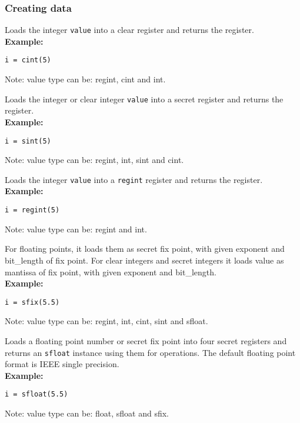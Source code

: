 \newpage

\subsubsection{Creating data}

Loads the integer \verb|value| into a clear register and returns the register.\\
\textbf{Example:}
\begin{lstlisting}
i = cint(5)
\end{lstlisting}
\begin{footnotesize}
Note: value type can be: regint, cint and int.
\end{footnotesize}

Loads the integer or clear integer \verb|value| into a secret register and returns the register.\\
\textbf{Example:}
\begin{lstlisting}
i = sint(5)
\end{lstlisting}
\begin{footnotesize}
Note: value type can be: regint, int, sint and cint.
\end{footnotesize}

Loads the integer \verb|value| into a \verb|regint| register and returns 
the register.\\
\textbf{Example:}
\begin{lstlisting}
i = regint(5)
\end{lstlisting}
\begin{footnotesize}
Note: value type can be: regint and int.
\end{footnotesize}

For floating points, it loads them as secret fix point, with given exponent and bit_length of fix point.
For clear integers and secret integers it loads value as mantissa of fix point, with given exponent and bit_length.\\
\textbf{Example:}
\begin{lstlisting}
i = sfix(5.5)
\end{lstlisting}
\begin{footnotesize}
Note: value type can be: regint, int, cint, sint and sfloat.
\end{footnotesize}

Loads a floating point number or secret fix point into four secret registers and returns an \verb|sfloat| instance using them for operations.
The default floating point format is IEEE single precision.\\
\textbf{Example:}
\begin{lstlisting}
i = sfloat(5.5)
\end{lstlisting}
\begin{footnotesize}
Note: value type can be: float, sfloat and sfix.
\end{footnotesize}

